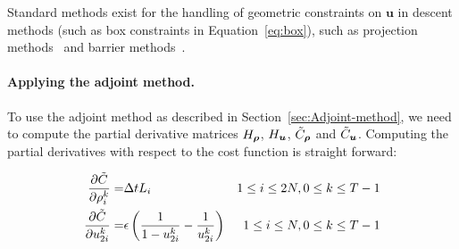 Standard methods exist for the handling of geometric constraints on $\mathbf{u}$ in descent methods (such as box constraints in Equation~\eqref{eq:box}), such as projection methods~\cite{Apice2010Modeling} and barrier methods~\cite{Fiacco1990Nonlinear,Boyd2010,Bayen2006}.







\paragraph{Applying the adjoint method.}

To use the adjoint method as described in Section~\ref{sec:Adjoint-method},
we need to compute the partial derivative matrices $\Hx$, $\Hu$,
$\tilde{C}_{\state}$ and $\tilde{C}_{\control}$. Computing the partial
derivatives with respect to the cost function is straight forward:

\begin{eqnarray*}
\frac{\partial\tilde{C}}{\partial\rho_{i}^{k}}= & \Delta tL_{i} & 1\le i\le2N,0\le k\le T-1\\
\frac{\partial\tilde{C}}{\partial u_{2i}^{k}}= & \epsilon\left(\frac{1}{1-u_{2i}^{k}}-\frac{1}{u_{2i}^{k}}\right) & 1\le i\le N,0\le k\le T-1
\end{eqnarray*}


